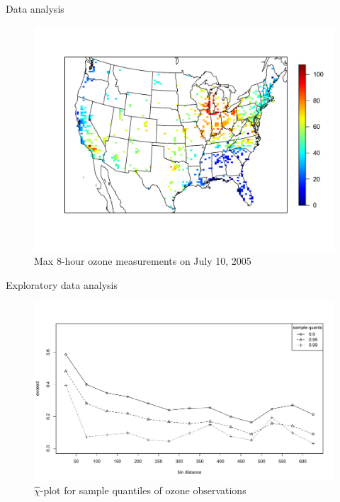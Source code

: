 \documentclass{beamer}
\begin{document}
\begin{frame}{Data analysis}
  \centering
  \begin{figure}
    \includegraphics[width=\linewidth, trim=0 1in 0 0.7in ]{./plots/pot/ozone-10jul-us.pdf}
    \caption{Max 8-hour ozone measurements on July 10, 2005}
   \end{figure}
\end{frame}

\begin{frame}{Exploratory data analysis}
	\centering
  \begin{figure}
    \includegraphics[width=1\linewidth, trim=0 0 0 1in]{./plots/pot/chi-plot-ozone-res.pdf}
    \caption{$\widehat{\chi}$-plot for sample quantiles of ozone observations}
  \end{figure}
\end{frame}
\end{document}

